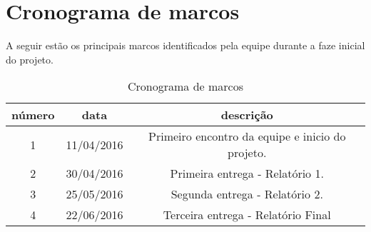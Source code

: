 \section{Cronograma de marcos}

  A seguir estão os principais marcos identificados pela equipe
  durante a faze inicial do projeto.

  \begin{table}[ht]
    \centering
    \caption{Cronograma de marcos}
    \begin{tabular}{| c | c | c |}
      \hline
      \textbf{número} & \textbf{data} & \textbf{descrição} \\
      \hline
      1 & 11/04/2016 & Primeiro encontro da equipe e inicio do projeto. \\
      \hline
      2 & 30/04/2016 & Primeira entrega - Relatório 1. \\
      \hline
      3 & 25/05/2016 & Segunda entrega - Relatório 2. \\
      \hline
      4 & 22/06/2016 & Terceira entrega - Relatório Final \\
      \hline
    \end{tabular}
  \end{table}
